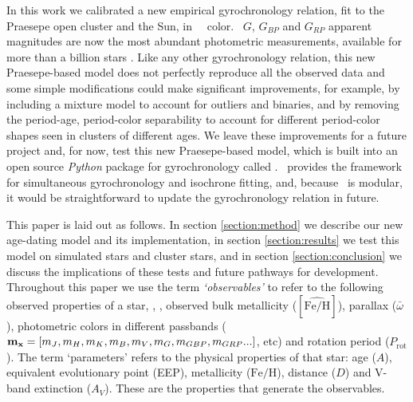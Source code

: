In this work we calibrated a new empirical gyrochronology relation, fit to the
Praesepe open cluster and the Sun, in \gaia\ \gcolor\ color.
\Gaia\ $G$, $G_{BP}$ and $G_{RP}$ apparent magnitudes are now the most
abundant photometric measurements, available for more than a billion stars
\citep{brown2018}.
Like any other gyrochronology relation, this new Praesepe-based model does not
perfectly reproduce all the observed data and some simple modifications could
make significant improvements, for example, by including a mixture model to
account for outliers and binaries, and by removing the period-age,
period-color separability to account for different period-color shapes seen in
clusters of different ages.
We leave these improvements for a future project and, for now, test this
new Praesepe-based model, which is built into an open source {\it Python}
package for gyrochronology called \sd.
\sd\ provides the framework for simultaneous gyrochronology and isochrone
fitting, and, because \sd\ is modular, it would be straightforward to update
the gyrochronology relation in future.

This paper is laid out as follows.
In section \ref{section:method} we describe our new age-dating model and its
implementation, in section \ref{section:results} we test this model on
simulated stars and cluster stars, and in section \ref{section:conclusion} we
discuss the implications of these tests and future pathways for development.
Throughout this paper we use the term {\it `observables'} to refer to the
following observed properties of a star, \teff, \logg, observed bulk
metallicity ($[\hat{\mathrm{Fe/H}}]$), parallax ($\bar{\omega}$), photometric
colors in different passbands (${\bf m_x} = [m_J, m_H, m_K, m_B, m_V, m_G,
m_{GBP}, m_{GRP}...]$, etc) and rotation period ($P_{\mathrm{rot}}$).
The term `parameters' refers to the physical properties of that star: age
($A$), equivalent evolutionary point (EEP), metallicity ($\mathrm{Fe/H}$),
distance ($D$) and V-band extinction ($A_V$).
These are the properties that generate the observables.
